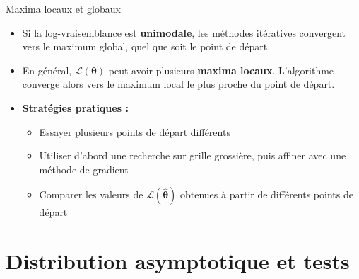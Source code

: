 \documentclass[11pt,aspectratio=169]{beamer}
\begin{document}
\begin{frame}{Maxima locaux et globaux}

\begin{itemize}

\item Si la log-vraisemblance est \textbf{unimodale}, les méthodes itératives convergent vers le maximum global, quel que soit le point de départ.\newline

\item En général, $\mathcal{L}(\bm{\theta})$ peut avoir plusieurs \textbf{maxima locaux}. L'algorithme converge alors vers le maximum local le plus proche du point de départ.\newline

\item \textbf{Stratégies pratiques :}
  \begin{itemize}
    \item Essayer plusieurs points de départ différents\newline
    \item Utiliser d'abord une recherche sur grille grossière, puis affiner avec une méthode de gradient\newline
    \item Comparer les valeurs de $\mathcal{L}(\hat{\bm{\theta}})$ obtenues à partir de différents points de départ
  \end{itemize}

\end{itemize}

\end{frame}

\section{Distribution asymptotique et tests}
\end{document}
